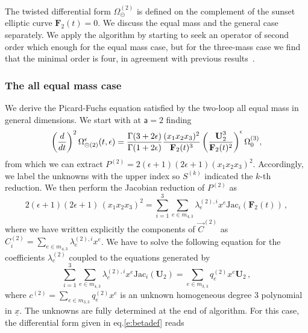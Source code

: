 \documentclass[a4paper,12pt]{article}
\numberwithin{equation}{section}
\numberwithin{figure}{section}
\def\su{\circleddash}
\begin{document}
The twisted differential form $\Omega_\su^{(2)}$ is defined on the
complement of the sunset elliptic curve $\mathbf{F}_2(t)=0$.
%
We discuss the equal mass and the general case separately.
We apply the algorithm by starting to seek an operator of second order which enough for the equal mass case, but for the
three-mass case we find that the minimal order is four, in
agreement with previous results~\cite{Caffo:1998du,Remiddi:2013joa,Adams:2015gva}.

\subsubsection{The all equal mass case}\label{sec:2sunset1mass}
We derive the Picard-Fuchs equation satisfied by the two-loop all
equal mass in general dimensions. 
We  start with at $\mathsf{a}=2$ finding
\begin{equation}
 \left(d\over dt\right)^2
 \Omega_{\su(2)}^{\epsilon}(t,\epsilon)={\Gamma(3+2\epsilon)\over\Gamma(1+2\epsilon)} {(x_1x_2x_3)^2\over \textbf{F}_2(t)^3}
 \left(\textbf{U}_2^3\over \textbf{F}_2(t)^2\right)^\epsilon  \Omega_0^{(3)} ,
\end{equation}
from which we can extract $P^{(2)}=2 (\epsilon +1) (2 \epsilon +1)(x_1x_2x_3)^2$. 
%
Accordingly, we label the unknowns with the upper index so $S^{(k)}$ indicated the $k$-th reduction. We then  perform the Jacobian reduction of $P^{(2)}$ as
\begin{equation}\label{e:reduc}
  2 (\epsilon +1) (2 \epsilon +1)\,  (x_1x_2x_3)^2= \sum_{i=1}^3 
  \sum_{e\in m_{4,3}}\lambda^{(2),i}_{e} x^e \text{Jac}_i  (\mathbf{F}_2(t)) \,,
\end{equation}
%
where we have written explicitly the components of $\vec{C}^{(2)}$ as $C^{(2)}_i=\sum_{e\in m_{4,3}}\lambda^{(2),i}_{e} x^e$.
We have to solve the following equation for the coefficients $\lambda_e^{(2)}$ coupled to the equations generated by
\begin{equation}\label{e:C2red}
\sum_{i=1}^3 
\sum_{e\in m_{4,3}}\lambda^{(2),i}_{e} x^e \text{Jac}_i(\mathbf U_2) = \sum_{e\in m_{3,3}} q^{(2)}_e x^e \textbf{U}_2 \,, 
%
\end{equation}
where $c^{(2)}=\sum_{e\in m_{3,3}} q^{(2)}_e x^e$ is an unknown homogeneous degree 3 polynomial
in $\underline x$.
%
The unknowns are fully determined at the end of  algorithm. For this case, 
the differential form given in eq.\eqref{e:betadef} reads
\end{document}
